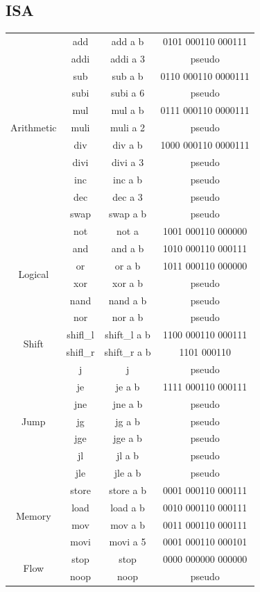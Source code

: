 \documentclass[11pt,a4paper]{article}
\begin{document}
\subsection*{ISA}
\begin{tabular}{|c|c|c|c|}
\hline
\multirow{11}{*}{Arithmetic} & add & add a b & 0101 000110 000111 \\
& addi & addi a 3 & pseudo \\
& sub & sub a b & 0110 000110 0000111\\
& subi & subi a 6 & pseudo\\
& mul & mul a b & 0111 000110 0000111\\
& muli & muli a 2 & pseudo\\
& div & div a b & 1000 000110 0000111\\
& divi & divi a 3 & pseudo\\
& inc & inc a b & pseudo\\
& dec & dec a 3 & pseudo\\
& swap & swap a b & pseudo\\
\hline
\multirow{6}{*}{Logical} & not & not a & 1001 000110 000000\\
& and & and a b & 1010 000110 000111\\
& or & or a b & 1011 000110 000000\\
& xor & xor a b & pseudo\\
& nand & nand a b & pseudo\\
& nor & nor a b & pseudo\\
\hline
\multirow{2}{*}{Shift} & shifl\_l & shift\_l a b & 1100 000110 000111\\
& shifl\_r & shift\_r a b & 1101 000110\\
\hline
\multirow{7}{*}{Jump} & j & j & pseudo \\
& je & je a b & 1111 000110 000111 \\
& jne & jne a b & pseudo \\
& jg & jg a b & pseudo \\
& jge & jge a b & pseudo \\
& jl & jl a b & pseudo \\
& jle & jle a b & pseudo \\
\hline
\multirow{4}{*}{Memory} & store & store a b & 0001 000110 000111\\
& load & load a b & 0010 000110 000111\\
& mov & mov a b & 0011 000110 000111\\
& movi & movi a 5 & 0001 000110 000101\\
\hline
\multirow{2}{*}{Flow} & stop & stop & 0000 000000 000000 \\
& noop & noop & pseudo \\
\hline
\end{tabular}
\end{document}
